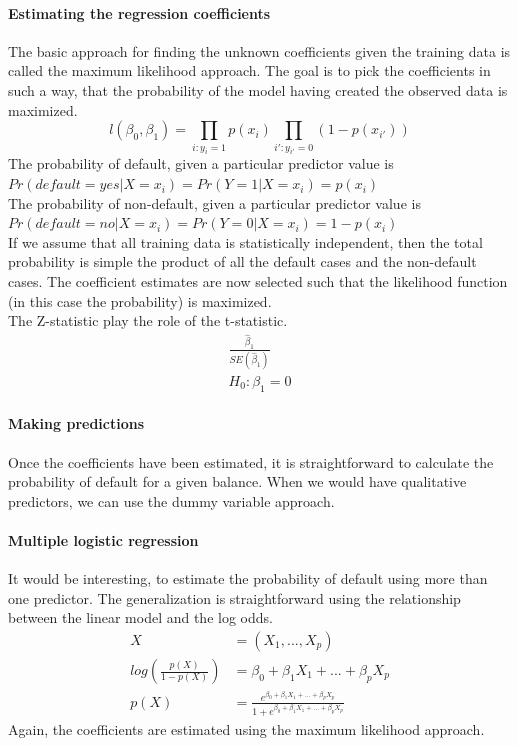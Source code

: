 \documentclass[../document.tex]{subfiles}
\begin{document}
	\paragraph{Estimating the regression coefficients}
	The basic approach for finding the unknown coefficients given the training data is called the maximum likelihood approach. The goal is to pick the coefficients in such a way, that the probability of the model having created the observed data is maximized.
	\begin{equation}
		l(\beta_{0},\beta_{1})=\prod_{i:y_{i}=1}p(x_{i})\prod_{i':y_{i'}=0}(1-p(x_{i'}))
	\end{equation}
	The probability of default, given a particular predictor value is \(Pr(default=yes|X=x_{i})=Pr(Y=1|X=x_{i})=p(x_{i})\)\\
	The probability of non-default, given a particular predictor value is \(Pr(default=no|X=x_{i})=Pr(Y=0|X=x_{i})=1-p(x_{i})\)\\
	If we assume that all training data is statistically independent, then the total probability is simple the product of all the default cases and the non-default cases. The coefficient estimates are now selected such that the likelihood function (in this case the probability) is maximized.\\
	The Z-statistic play the role of the t-statistic.
	\begin{equation}
	\begin{split}
		\frac{\hat{\beta}_{1}}{SE(\hat{\beta}_{1})}\\
		H_{0}:\beta_{1}=0
	\end{split}
	\end{equation}

	\paragraph{Making predictions}
	Once the coefficients have been estimated, it is straightforward to calculate the probability of default for a given balance. When we would have qualitative predictors, we can use the dummy variable approach.

	\paragraph{Multiple logistic regression}
	It would be interesting, to estimate the probability of default using more than one predictor. The generalization is straightforward using the relationship between the linear model and the log odds.
	\begin{equation}
	\begin{split}
		X &= (X_{1},...,X_{p})\\
		log(\frac{p(X)}{1-p(X)})&=\beta_{0}+\beta_{1}X_{1}+...+\beta_{p}X_{p}\\
		p(X)&=\frac{e^{\beta_{0}+\beta_{1}X_{1}+...+\beta_{p}X_{p}}}{1+e^{\beta_{0}+\beta_{1}X_{1}+...+\beta_{p}X_{p}}}
	\end{split}
	\end{equation}
	Again, the coefficients are estimated using the maximum likelihood approach.
\end{document}
